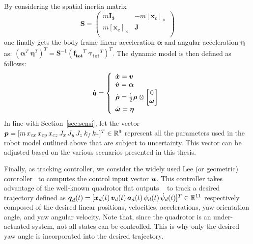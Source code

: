 By considering the spatial inertia matrix
\[
\boldsymbol{S} =   \left( {\begin{array}{cc}
    m\boldsymbol{I_3} & -m[\boldsymbol{x_c}]_{\times} \\
    m[\boldsymbol{x_c}]_{\times} & \boldsymbol{J} \\
  \end{array} } \right)
\]
one finally gets the body frame linear acceleration $\boldsymbol{\alpha}$ and angular acceleration $\boldsymbol{\eta}$
as: 
$
\left( 
    \boldsymbol{\alpha}^T \; \boldsymbol{\eta}^T \right)^T 
  =
  \boldsymbol{S}^{-1}
  \left( \boldsymbol{f_{tot}}^T \;
    \boldsymbol{\tau_{tot}}^T \right)^T. 
$
The dynamic model is then defined as follows:
\begin{equation}\label{eq:quad_dynamic}
    \Dot{\boldsymbol{q}}
    =
     \left \{
     \begin{array}{l l}
           \dot{\boldsymbol{x}} = \boldsymbol{v} \\
           
           \dot{\boldsymbol{v}}= \boldsymbol{\alpha} \\

           \dot{\boldsymbol{\rho}}=\frac{1}{2}
               \boldsymbol{\rho} \otimes \begin{bmatrix}
                                          0 \\
                                          \boldsymbol{\omega}
                                          \end{bmatrix} \\
           
           \dot{\boldsymbol{\omega}}=\boldsymbol{\eta}
   \end{array}
   \right . 
\end{equation}
In line with Section~\ref{sec:sensi}, let the vector $\boldsymbol{p} = [m \, x_{cx} \, x_{cy} \, x_{cz} \, J_{x} \, J_{y} \,J_{z} \, k_f \, k_{\tau}]^T \in \mathbb{R}^{9}$ represent all the parameters used in the robot model outlined above that are subject to uncertainty. 
This vector can be adjusted based on the various scenarios presented in this thesis.

Finally, as tracking controller, we consider the widely used Lee (or geometric) controller~\cite{cLee} to computes the control input vector $\boldsymbol{u}$.
This controller takes advantage of the well-known quadrotor flat outputs ~\cite{cFlat} to track a desired trajectory defined as $\boldsymbol{q}_d(t) = [\boldsymbol{x}_d(t) \, \boldsymbol{v}_d(t) \, \boldsymbol{a}_d(t) \, \psi_d(t) \, \Dot{\psi}_d(t)]^T \in \mathbb{R}^{11}$ respectively composed of the desired linear positions, velocities, accelerations, yaw orientation angle, and yaw angular velocity.
Note that, since the quadrotor is an under-actuated system, not all states can be controlled. This is why only the desired yaw angle is incorporated into the desired trajectory.

